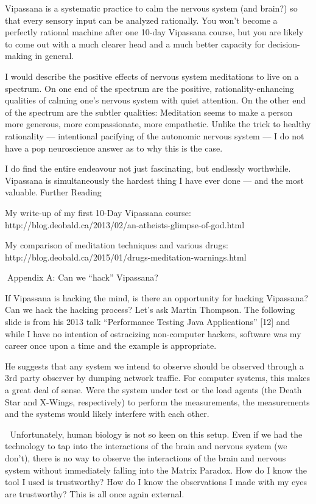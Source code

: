 \documentclass{article}
\begin{document}
Vipassana is a systematic practice to calm the nervous system (and brain?) so that every sensory input can be analyzed rationally. You won't become a perfectly rational machine after one 10-day Vipassana course, but you are likely to come out with a much clearer head and a much better capacity for decision-making in general.

I would describe the positive effects of nervous system meditations to live on a spectrum. On one end of the spectrum are the positive, rationality-enhancing qualities of calming one's nervous system with quiet attention. On the other end of the spectrum are the subtler qualities: Meditation seems to make a person more generous, more compassionate, more empathetic. Unlike the trick to healthy rationality — intentional pacifying of the autonomic nervous system — I do not have a pop neuroscience answer as to why this is the case.

I do find the entire endeavour not just fascinating, but endlessly worthwhile. Vipassana is simultaneously the hardest thing I have ever done — and the most valuable.Further Reading

My write-up of my first 10-Day Vipassana course:
http://blog.deobald.ca/2013/02/an-atheists-glimpse-of-god.html

My comparison of meditation techniques and various drugs:
http://blog.deobald.ca/2015/01/drugs-meditation-warnings.html

Appendix A:
Can we ``hack'' Vipassana?

If Vipassana is hacking the mind, is there an opportunity for hacking Vipassana? Can we hack the hacking process? Let's ask Martin Thompson. The following slide is from his 2013 talk ``Performance Testing Java Applications'' [12] and while I have no intention of ostracizing non-computer hackers, software was my career once upon a time and the example is appropriate.

He suggests that any system we intend to observe should be observed through a 3rd party observer by dumping network traffic. For computer systems, this makes a great deal of sense. Were the system under test or the load agents (the Death Star and X-Wings, respectively) to perform the measurements, the measurements and the systems would likely interfere with each other.




Unfortunately, human biology is not so keen on this setup. Even if we had the technology to tap into the interactions of the brain and nervous system (we don't), there is no way to observe the interactions of the brain and nervous system without immediately falling into the Matrix Paradox. How do I know the tool I used is trustworthy? How do I know the observations I made with my eyes are trustworthy? This is all once again external.
\end{document}

